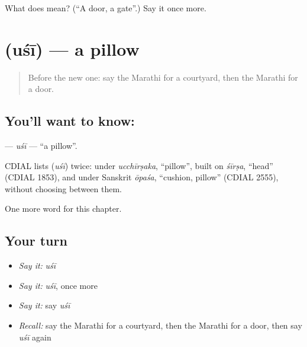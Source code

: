 \begin{tcolorbox}[breakable,colback=teal!4,colframe=teal!35!black,title={Before you move on}]
What does  mean? (\textquotedblleft{}A door, a gate\textquotedblright{}.) Say it once more.
\end{tcolorbox}
\section[\texorpdfstring{\mr{उशी} (uśī)}{उशी (uśī)}]{ (uśī) — a pillow}

\label{lesson:MR-C130-usi}



\begin{quote}
Before the new one: say the Marathi for a courtyard, then the Marathi for a door.
\end{quote}

\subsection*{You'll want to know: }
\textbf{} — \emph{uśī} — \textquotedblleft{}a pillow\textquotedblright{}.

\begin{cousinweb}
CDIAL lists \textbf{} (\emph{uśī}) twice: under \emph{ucchīrṣaka}, \textquotedblleft{}pillow\textquotedblright{}, built on \emph{śīrṣa}, \textquotedblleft{}head\textquotedblright{} (CDIAL 1853), and under Sanskrit \emph{ōpaśa}, \textquotedblleft{}cushion, pillow\textquotedblright{} (CDIAL 2555), without choosing between them.
\end{cousinweb}

\begin{grammarlens}[title={What you've built}]
One more word for this chapter.
\end{grammarlens}

\subsection*{Your turn}
\begin{itemize}
\raggedright
  \item \emph{Say it:} \emph{uśī}
  \item \emph{Say it:} \emph{uśī}, once more
  \item \emph{Say it:} say \emph{uśī}
  \item \emph{Recall:} say the Marathi for a courtyard, then the Marathi for a door, then say \emph{uśī} again
\end{itemize}

